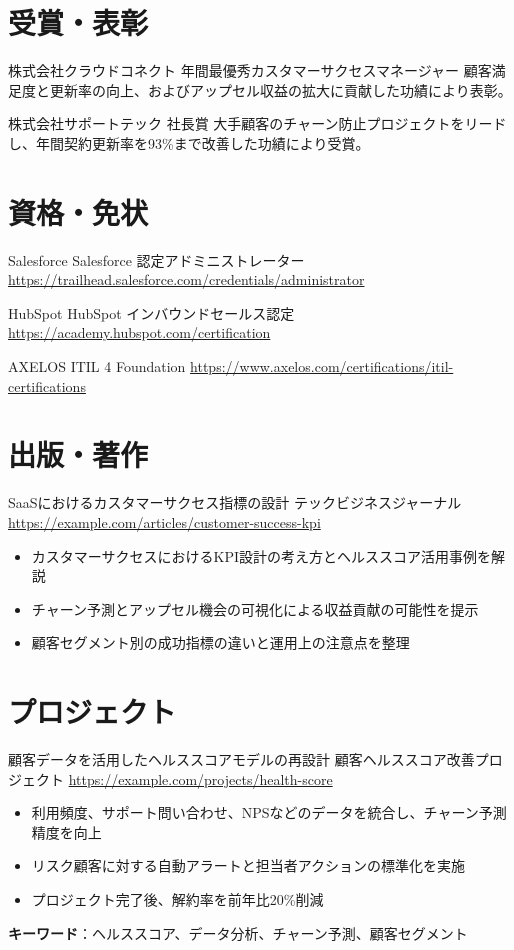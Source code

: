\documentclass[a4paper, serif, 10pt]{moderncv}
\begin{document}
\section{受賞・表彰}

        {株式会社クラウドコネクト}
        {年間最優秀カスタマーサクセスマネージャー}
        {}
        {}
        {顧客満足度と更新率の向上、およびアップセル収益の拡大に貢献した功績により表彰。}

        {株式会社サポートテック}
        {社長賞}
        {}
        {}
        {大手顧客のチャーン防止プロジェクトをリードし、年間契約更新率を93\%まで改善した功績により受賞。}
\section{資格・免状}

        {Salesforce}
        {Salesforce 認定アドミニストレーター}
        {\url{https://trailhead.salesforce.com/credentials/administrator}}
        {}
        {}

        {HubSpot}
        {HubSpot インバウンドセールス認定}
        {\url{https://academy.hubspot.com/certification}}
        {}
        {}

        {AXELOS}
        {ITIL 4 Foundation}
        {\url{https://www.axelos.com/certifications/itil-certifications}}
        {}
        {}
\section{出版・著作}

        {SaaSにおけるカスタマーサクセス指標の設計}
        {テックビジネスジャーナル}
        {\url{https://example.com/articles/customer-success-kpi}}
        {}
        {\begin{itemize}
\item カスタマーサクセスにおけるKPI設計の考え方とヘルススコア活用事例を解説
\item チャーン予測とアップセル機会の可視化による収益貢献の可能性を提示
\item 顧客セグメント別の成功指標の違いと運用上の注意点を整理
\end{itemize}}
\section{プロジェクト}

        {顧客データを活用したヘルススコアモデルの再設計}
        {顧客ヘルススコア改善プロジェクト}
        {\url{https://example.com/projects/health-score}}
        {}
        {\begin{itemize}
\item 利用頻度、サポート問い合わせ、NPSなどのデータを統合し、チャーン予測精度を向上
\item リスク顧客に対する自動アラートと担当者アクションの標準化を実施
\item プロジェクト完了後、解約率を前年比20\%削減
\end{itemize}
\textbf{キーワード}：ヘルススコア、データ分析、チャーン予測、顧客セグメント}
\end{document}
